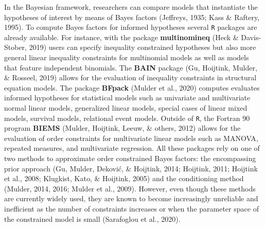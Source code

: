 \documentclass[
  english,
  man,floatsintext]{apa6}
\begin{document}
In the Bayesian framework, researchers can compare models that instantiate the hypotheses of interest by means of Bayes factors (Jeffreys, 1935; Kass \& Raftery, 1995). To compute Bayes factors for informed hypotheses several \texttt{R} packages are already available. For instance, with the package \textbf{multinomineq} (Heck \& Davis-Stober, 2019) users can specify inequality constrained hypotheses but also more general linear inequality constraints for multinomial models as well as models that feature independent binomials. The \textbf{BAIN} package (Gu, Hoijtink, Mulder, \& Rosseel, 2019) allows for the evaluation of inequality constraints in structural equation models. The package \textbf{BFpack} (Mulder et al., 2020) computes evaluates informed hypotheses for statistical models such as univariate and multivariate normal linear models, generalized linear models, special cases of linear mixed models, survival models, relational event models. Outside of \texttt{R}, the Fortran 90 program \textbf{BIEMS} (Mulder, Hoijtink, Leeuw, \& others, 2012) allows for the evaluation of order constraints for multivariate linear models such as MANOVA, repeated measures, and multivariate regression. All these packages rely on one of two methods to approximate order constrained Bayes factors: the encompassing prior approach (Gu, Mulder, Deković, \& Hoijtink, 2014; Hoijtink, 2011; Hoijtink et al., 2008; Klugkist, Kato, \& Hoijtink, 2005) and the conditioning method (Mulder, 2014, 2016; Mulder et al., 2009). However, even though these methods are currently widely used, they are known to become increasingly unreliable and inefficient as the number of constraints increases or when the parameter space of the constrained model is small (Sarafoglou et al., 2020).
\end{document}

